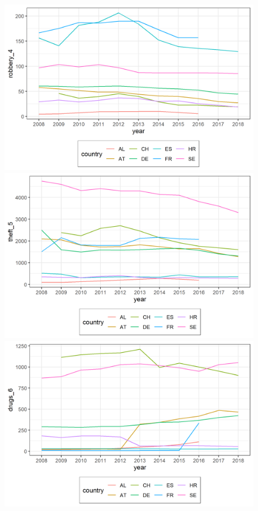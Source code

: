 \documentclass[a4paper,12pt]{article}
\begin{document}
\begin{figure}[!h]
\begin{minipage}{0.45\textwidth}
\end{minipage}
\begin{minipage}{0.45\textwidth}
  \includegraphics[trim={0 0 0 0},width=\linewidth]{charts/des_line_sexual_robbery_4_.png}
\end{minipage}
\begin{minipage}{0.45\textwidth}
  \includegraphics[trim={0 0 0 0},width=\linewidth]{charts/des_line_theft_5_.png}
\end{minipage}
\begin{minipage}{0.45\textwidth}
  \includegraphics[trim={0 0 0 0},width=\linewidth]{charts/des_line_drugs_6_.png}
\end{minipage}


\end{figure}
\end{document}
